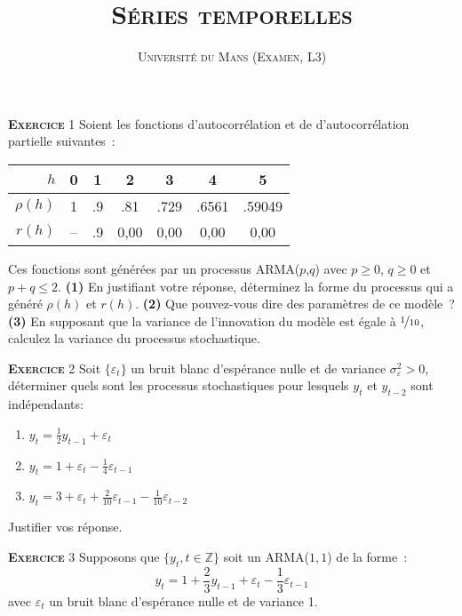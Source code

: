 \documentclass[10pt,a4paper,notitlepage,twocolumn]{article}
\newcommand{\exercice}[1]{\textsc{\textbf{Exercice}} #1}
\newcommand{\question}[1]{\textbf{(#1)}}
\begin{document}
\title{\textsc{Séries temporelles}}
\author{\textsc{Université du Mans (Examen, L3)}}
\date{}


\maketitle

\exercice{1} Soient les fonctions d'autocorrélation et de d'autocorrélation
partielle suivantes :
\begin{table}[H]
  \centering
  \begin{tabular}{r|cccccc}
    \hline\hline
    $h$ & 0 & 1 & 2 & 3 & 4 & 5 \\\hline
    $\rho (h)$ & 1 & .9 & .81 & .729 & .6561 & .59049\\
    $r (h)$ & -- & .9 & 0,00 & 0,00 & 0,00 & 0,00\\
    \hline\hline
  \end{tabular}
\end{table}
\noindent Ces fonctions sont générées par un processus ARMA($p$,$q$) avec
$p\geq 0$, $q\geq 0$ et $p+q \leq 2$. \question{1} En justifiant votre réponse,
déterminez la forme du processus qui a généré $\rho(h)$ et $r(h)$. \question{2}
Que pouvez-vous dire des paramètres de ce modèle~? \question{3} En supposant que
la variance de l'innovation du modèle est égale à $\nicefrac{1}{10}$, calculez
la variance du processus stochastique.\newline

\bigskip

\exercice{2} Soit $\{\varepsilon_t\}$ un bruit blanc d'espérance nulle
et de variance $\sigma_{\varepsilon}^2>0$, déterminer quels sont les
processus stochastiques pour lesquels $y_t$ et $y_{t-2}$ sont
indépendants:
\begin{enumerate}
\item $y_t = \frac{1}{2}y_{t-1} + \varepsilon_t$
\item $y_t = 1 + \varepsilon_t - \frac{1}{4} \varepsilon_{t-1}$
\item $y_t = 3 + \varepsilon_t + \frac{2}{10} \varepsilon_{t-1} - \frac{1}{10} \varepsilon_{t-2}$
\end{enumerate}
Justifier vos réponse.\newline

\bigskip

\exercice{3} Supposons que $\{y_t,t\in\mathbb Z\}$ soit un ARMA($1,1$) de la forme :
\[
y_t = 1 + \frac{2}{3}y_{t-1} + \varepsilon_t - \frac{1}{3} \varepsilon_{t-1}
\]
avec $\varepsilon_t$ un bruit blanc d'espérance nulle et de variance 1.\newline
\end{document}
